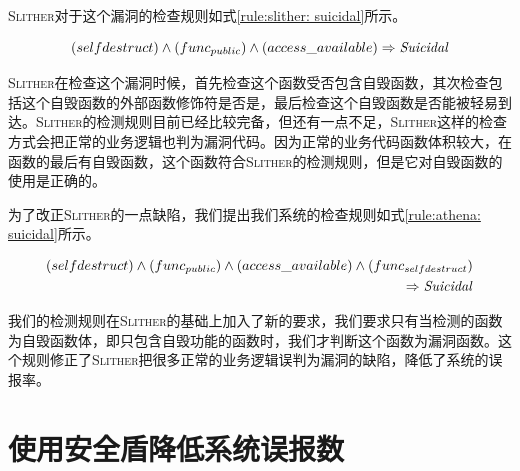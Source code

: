 \textsc{Slither}对于这个漏洞的检查规则如式\ref{rule:slither: suicidal}所示。
\begin{mdframed}[
	linewidth = 1pt,
	innertopmargin = -5pt,
	innerbottommargin = 3pt,
	outerlinewidth = 1pt
	]
    \small
	\begin{equation} \label{rule:slither: suicidal}
    (selfdestruct) \wedge (func_{public}) \wedge (access\_available) \Rightarrow \text{\emph{Suicidal}}
	\end{equation}
\end{mdframed}
\textsc{Slither}在检查这个漏洞时候，首先检查这个函数受否包含自毁函数，其次检查包括这个自毁函数的外部函数修饰符是否是，最后检查这个自毁函数是否能被轻易到达。\textsc{Slither}的检测规则目前已经比较完备，但还有一点不足，\textsc{Slither}这样的检查方式会把正常的业务逻辑也判为漏洞代码。因为正常的业务代码函数体积较大，在函数的最后有自毁函数，这个函数符合\textsc{Slither}的检测规则，但是它对自毁函数的使用是正确的。

为了改正\textsc{Slither}的一点缺陷，我们提出我们系统的检查规则如式\ref{rule:athena: suicidal}所示。
\begin{mdframed}[
	linewidth = 1pt,
	innertopmargin = -10pt,
	innerbottommargin = 3pt,
	outerlinewidth = 1pt
	]
    \small
	\begin{equation} \label{rule:athena: suicidal}
    \begin{split}
       (selfdestruct) \wedge (func_{public}) \wedge (access\_available) \wedge (func_{selfdestruct}) \\
       \Rightarrow \text{\emph{Suicidal}}
    \end{split}
	\end{equation}
\end{mdframed}
我们的检测规则在\textsc{Slither}的基础上加入了新的要求，我们要求只有当检测的函数为自毁函数体，即只包含自毁功能的函数时，我们才判断这个函数为漏洞函数。这个规则修正了\textsc{Slither}把很多正常的业务逻辑误判为漏洞的缺陷，降低了系统的误报率。

\section{使用安全盾降低系统误报数}\label{sec:ss}

